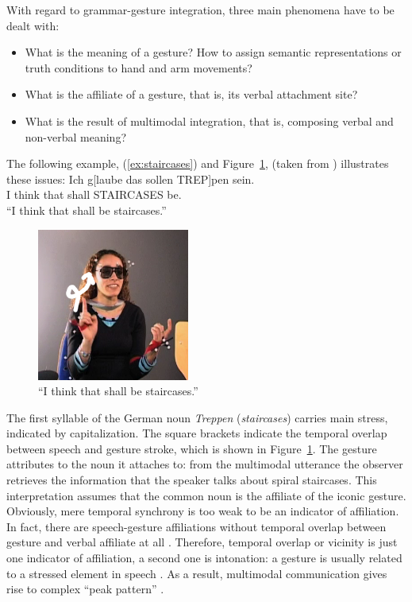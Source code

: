 \documentclass[output=paper]{langsci/langscibook}
\begin{document}
With regard to grammar-gesture integration, three main phenomena have to be dealt with:
%
\begin{itemize}
\item What is the meaning of a gesture? How to assign semantic representations or truth conditions to hand and arm movements?
\item What is the affiliate of a gesture, that is, its verbal attachment site? 
\item What is the result of multimodal integration, that is, composing verbal and non-verbal meaning? 
\end{itemize}


The following example, (\ref{ex:staircases}) and Figure~\ref{fig:staircases}, (taken from \citet[189]{Luecking:2013:a}) illustrates these issues:
%
\ea \label{ex:staircases}
\glt Ich g[laube das sollen TREP]pen sein.\\
     I think that shall STAIRCASES be. \\
\glt \enquote{I think that shall be staircases.}
\z

\begin{figure}[tb]
  \includegraphics[width=5cm]{figures/treppen-2}
  \caption{\enquote{I think that shall be staircases.}}
  \label{fig:staircases}
\end{figure}

The first syllable of the German noun \textit{Treppen} (\textit{staircases}) carries main stress, indicated by capitalization. 
%
The square brackets indicate the temporal overlap between speech and gesture stroke, which is shown in Figure~\ref{fig:staircases}.
%
The gesture attributes to the noun it attaches to: from the multimodal utterance the observer retrieves the information that the speaker talks about spiral staircases. 
%
This interpretation assumes that the common noun is the affiliate of the iconic gesture.
%
Obviously, mere temporal synchrony is too weak to be an indicator of affiliation.
%
In fact, there are speech-gesture affiliations without temporal overlap between gesture and verbal affiliate at all \citep[e.g.][]{Luecking:Rieser:Stegmann:2004}.
%
Therefore, temporal overlap or vicinity is just one indicator of affiliation, a second one is intonation: a gesture is usually related to a stressed element in speech \citep{McClave:1994,Nobe:2000,Loehr:2004,Loehr:2007}. 
%
As a result, multimodal communication gives rise to complex \enquote{peak pattern} \citep{Tuite:1993,Loehr:2004,Jannedy:Mendoza-Denton:2005}.
\end{document}
